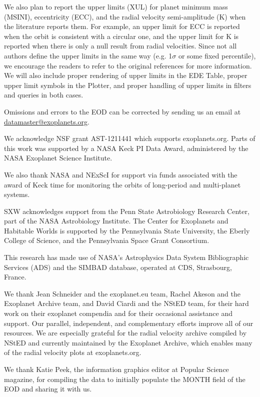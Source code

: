 \documentclass[11pt,preprint]{aastex}
\begin{document}
\begin{CJK*}{UTF8}{gbsn}
We also plan to report the upper limits (XUL) for planet minimum mass (MSINI),
eccentricity (ECC), and the radial velocity semi-amplitude (K) when
the literature reports them. For example, an upper limit for ECC is
reported when the orbit is consistent with a circular one, and the
upper limit for K is reported when there is only a null result from
radial velocities. Since not all authors define the upper limits in the same
way (e.g. 1$\sigma$ or some fixed percentile), we encourage the
readers to refer to the original references for more information. We
will also include proper rendering of upper limits in the EDE Table,
proper upper limit symbols in the Plotter, and proper handling of
upper limits in filters and queries in both cases. 
 
Omissions and errors to the EOD can be corrected by sending us an
email at \url{datamaster@exoplanets.org}.


\acknowledgments

We acknowledge NSF grant AST-1211441 which supports exoplanets.org.
Parts of this work was supported by a NASA Keck PI Data Award, administered by
the NASA Exoplanet Science Institute.

We also thank NASA and NExScI for support via funds associated with
the award of Keck time for monitoring the orbits of long-period and
multi-planet systems.

SXW acknowledges support from the Penn State Astrobiology Research
Center, part of the NASA Astrobiology Institute. The Center for
Exoplanets and Habitable Worlds is supported by the 
Pennsylvania State University, the Eberly College of Science, and the
Pennsylvania Space Grant Consortium.

This research has made use of
NASA's Astrophysics Data System Bibliographic Services (ADS) and the SIMBAD database,
operated at CDS, Strasbourg, France. 

We thank Jean Schneider and the exoplanet.eu team, Rachel Akeson
and the Exoplanet Archive team, and David Ciardi and the NStED team,
for their hard work on their exoplanet compendia and for their
occasional assistance and support.  Our parallel,
independent, and complementary efforts improve all of our resources.
We are especially grateful for the radial velocity archive compiled by
NStED and currently maintained by the Exoplanet Archive, which enables
many of the radial velocity plots at exoplanets.org.

We thank Katie Peek, the information graphics editor at Popular
Science magazine, for compiling the data to initially populate the
MONTH field of the EOD and sharing it with us.


\end{CJK*}
\end{document}
